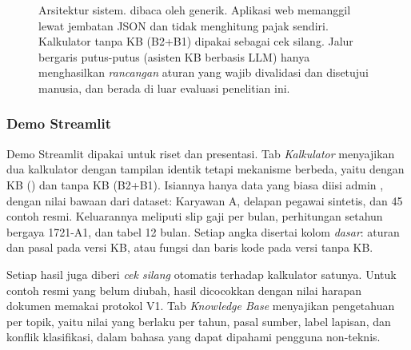 \begin{figure}[t]
\caption{Arsitektur sistem.  dibaca oleh  generik. Aplikasi web memanggil  lewat jembatan JSON dan tidak menghitung pajak sendiri. Kalkulator tanpa KB (B2+B1) dipakai sebagai cek silang. Jalur bergaris putus-putus (asisten KB berbasis LLM) hanya menghasilkan \emph{rancangan} aturan yang wajib divalidasi  dan disetujui manusia, dan berada di luar evaluasi penelitian ini.}
\label{fig:arsitektur}
\end{figure}

\subsubsection{Demo Streamlit}
Demo Streamlit dipakai untuk riset dan presentasi. Tab \emph{Kalkulator} menyajikan dua kalkulator dengan tampilan identik tetapi mekanisme berbeda, yaitu dengan KB () dan tanpa KB (B2+B1). Isiannya hanya data yang biasa diisi admin , dengan nilai bawaan dari dataset: Karyawan A, delapan pegawai sintetis, dan 45 contoh resmi. Keluarannya meliputi slip gaji per bulan, perhitungan setahun bergaya 1721-A1, dan tabel 12 bulan. Setiap angka disertai kolom \emph{dasar}: aturan dan pasal pada versi KB, atau fungsi dan baris kode pada versi tanpa KB.

Setiap hasil juga diberi \emph{cek silang} otomatis terhadap kalkulator satunya. Untuk contoh resmi yang belum diubah, hasil dicocokkan dengan nilai harapan dokumen memakai protokol V1. Tab \emph{Knowledge Base} menyajikan pengetahuan per topik, yaitu nilai yang berlaku per tahun, pasal sumber, label lapisan, dan konflik klasifikasi, dalam bahasa yang dapat dipahami pengguna non-teknis.

